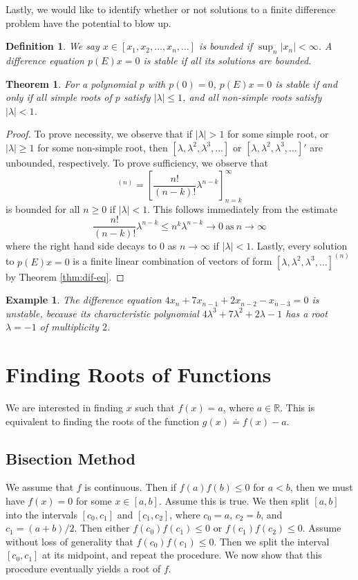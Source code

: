 \documentclass[12pt,reqno]{amsart}
\numberwithin{equation}{section}  %
\newcommand{\rr}{\mathbb{R}}
\newtheorem{theorem}{Theorem}
\newtheorem*{definition}{Definition}
\newtheorem*{example}{Example}
\begin{document}
Lastly, we would like to identify whether or not solutions  to a finite
difference problem have the potential to blow up.
\begin{definition}
We say $x \in [x_1, x_2, \ldots, x_n, \ldots]$ is \emph{bounded}
if $\sup_n | x_n | < \infty$. A difference equation $p(E)x = 0$ is 
\emph{stable} if all its solutions are bounded.
\end{definition}
\begin{theorem}
For a polynomial $p$ with $p(0) = 0$, $p(E)x = 0$ is stable if and only if
all simple roots of $p$ satisfy $|\lambda| \le 1$, and all non-simple roots
satisfy $|\lambda| < 1$. 
\end{theorem}
\begin{proof}
To prove necessity, we observe that if $|\lambda| > 1$ for some simple root, or
$|\lambda| \ge 1$ for some non-simple root, then $[\lambda, \lambda^2, \lambda^3,
\ldots]$ or $[\lambda, \lambda^2, \lambda^3, \ldots]'$ are unbounded, respectively.
To prove sufficiency, we observe that
\begin{equation*}
[\lambda, \lambda^2, \lambda^3,
\ldots]^{(n)} = \left [ \frac{n!}{(n - k)!} \lambda^{n - k} \right ]_{n =
k}^{\infty} 
\end{equation*}
is bounded for all $n \ge 0$ if $|\lambda| < 1$. This follows immediately from
the estimate 
\begin{equation*}
\frac{n!}{(n - k)!} \lambda^{n - k}  \le n^{k} \lambda^{n-k} \to 0 \ \text{as} \
n \to \infty
\end{equation*}
where the right hand side decays to $0$ as $n \to \infty$ if $|\lambda| < 1$. Lastly,
every  solution to $p(E)x = 0$ is a finite linear combination of vectors of form
$[\lambda, \lambda^2, \lambda^3, \ldots]^{(n)}$ by Theorem \ref{thm:dif-eq}.
\end{proof}
\begin{example}
The difference equation $4x_n + 7x_{n-1} + 2 x_{n-2} - x_{n-3} = 0$ is
unstable, because its characteristic polynomial 
$4\lambda^{3} + 7\lambda^{2} + 2 \lambda - 1$ has a root $\lambda= -1$  
of multiplicity $2$.
\end{example}
\section{Finding Roots of Functions}
We are interested in finding $x$ such that
$f(x) = a$, where $a \in \rr$. This is equivalent to finding
the roots of the function $g(x) \doteq f(x) - a$.
\subsection{Bisection Method}
We assume that $f$ is continuous. Then if $f(a)f(b) \le 0$ for $a < b$,
then we must have $f(x) = 0$ for some $x \in [a,b]$. Assume this is true.
We then split
$[a,b]$ into the intervals $[c_0, c_1]$ and $[c_1, c_2]$, where $c_0 = a$, $c_2 = b$, and
$c_1 = (a + b)/2$. Then either $f(c_0)f(c_1) \le 0$ or $f(c_1)f(c_2) \le 0$.
Assume without loss of generality that $f(c_0)f(c_1) \le 0$. Then we
split the interval $[c_0, c_1]$ at its midpoint, and repeat the procedure. We
now show that this procedure eventually yields a root of $f$.  
\end{document}
